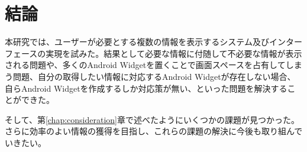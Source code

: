 \chapter{結論}
\label{chap:conclusion}

本研究では、ユーザーが必要とする複数の情報を表示するシステム及びインターフェースの実現を試みた。結果として必要な情報に付随して不必要な情報が表示される問題や、多くのAndroid Widgetを置くことで画面スペースを占有してしまう問題、自分の取得したい情報に対応するAndroid Widgetが存在しない場合、自らAndroid Widgetを作成するしか対応策が無い、といった問題を解決することができた。

そして、第\ref{chap:consideration}章で述べたようにいくつかの課題が見つかった。さらに効率のよい情報の獲得を目指し、これらの課題の解決に今後も取り組んでいきたい。
